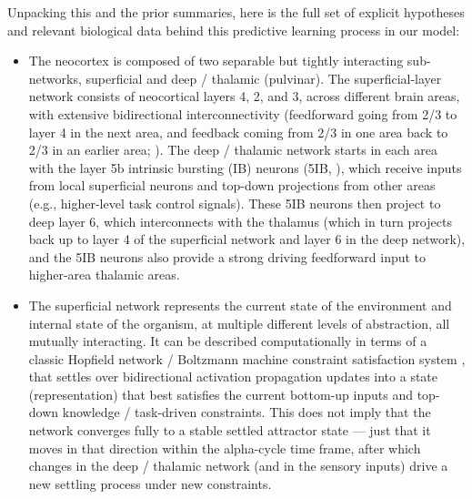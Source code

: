\documentclass[11pt,twoside]{article}
\newif\myifpdf
\begin{document}
Unpacking this and the prior summaries, here is the full set of explicit hypotheses and relevant biological data behind this predictive learning process in our model:
\begin{itemize}
\item The neocortex is composed of two separable but tightly interacting sub-networks, superficial and deep / thalamic (pulvinar).  The superficial-layer network consists of neocortical layers 4, 2, and 3, across different brain areas, with extensive bidirectional interconnectivity (feedforward going from 2/3 to layer 4 in the next area, and feedback coming from 2/3 in one area back to 2/3 in an earlier area; ). The deep / thalamic network starts in each area with the layer 5b intrinsic bursting (IB) neurons (5IB, ), which receive inputs from local superficial neurons and top-down projections from other areas (e.g., higher-level task control signals).  These 5IB neurons then project to deep layer 6, which interconnects with the thalamus (which in turn projects back up to layer 4 of the superficial network and layer 6 in the deep network), and the 5IB neurons also provide a strong driving feedforward input to higher-area thalamic areas.

\item The superficial network represents the current state of the environment and internal state of the organism, at multiple different levels of abstraction, all mutually interacting.  It can be described computationally in terms of a classic Hopfield network / Boltzmann machine constraint satisfaction system \cite{Hopfield82,Hopfield84,AckleyHintonSejnowski85,RumelhartMcClelland82}, that settles over bidirectional activation propagation updates into a state (representation) that best satisfies the current bottom-up inputs and top-down knowledge / task-driven constraints.  This does not imply that the network converges fully to a stable settled attractor state --- just that it moves in that direction within the alpha-cycle time frame, after which changes in the deep / thalamic network (and in the sensory inputs) drive a new settling process under new constraints.


\end{itemize}
\end{document}
